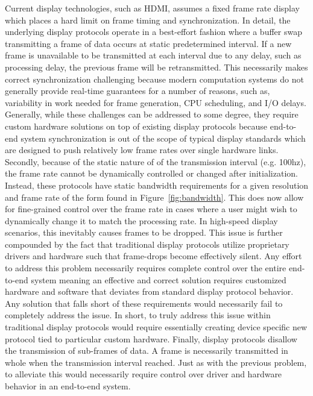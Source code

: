 Current display technologies, such as HDMI, assumes a fixed frame rate display which places a hard limit on frame timing and synchronization. In detail, the underlying display protocols operate in a best-effort fashion where a buffer swap transmitting a frame of data occurs at static predetermined interval. If a new frame is unavailable to be transmitted at each interval due to any delay, such as processing delay, the previous frame will be retransmitted. This necessarily makes correct synchronization challenging because modern computation systems do not generally provide real-time guarantees for a number of reasons, such as, variability in work needed for frame generation, CPU scheduling, and I/O delays. Generally, while these challenges can be addressed to some degree, they require custom hardware solutions on top of existing display protocols because end-to-end system synchronization is out of the scope of typical display standards which are designed to push relatively low frame rates over single hardware links. Secondly, because of the static nature of of the transmission interval (e.g. 100hz), the frame rate cannot be dynamically controlled or changed after initialization. Instead, these protocols have static bandwidth requirements for a given resolution and frame rate of the form found in Figure~\ref{fig:bandwidth}. This does now allow for fine-grained control over the frame rate in cases where a user might wish to dynamically change it to match the processing rate. In high-speed display scenarios, this inevitably causes frames to be dropped. This issue is further compounded by the fact that traditional display protocols utilize proprietary drivers and hardware such that frame-drops become effectively silent. Any effort to address this problem necessarily requires complete control over the entire end-to-end system meaning an effective and correct solution requires customized hardware and software that deviates from standard display protocol behavior. Any solution that falls short of these requirements would necessarily fail to completely address the issue. In short, to truly address this issue within traditional display protocols would require essentially creating device specific new protocol tied to particular custom hardware. Finally, display protocols disallow the transmission of sub-frames of data. A frame is necessarily transmitted in whole when the transmission interval reached. Just as with the previous problem, to alleviate this would necessarily require control over driver and hardware behavior in an end-to-end system.

